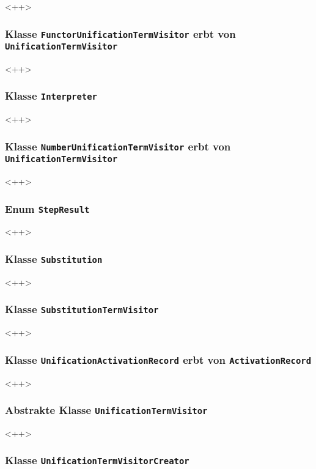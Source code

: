 \documentclass[parskip=full,11pt,twoside]{scrartcl}
\begin{document}
<++>

\subsubsection{Klasse \texttt{FunctorUnificationTermVisitor} erbt von \texttt{UnificationTermVisitor}}

<++>

\subsubsection{Klasse \texttt{Interpreter}}

<++>

\subsubsection{Klasse \texttt{NumberUnificationTermVisitor} erbt von \texttt{UnificationTermVisitor}}

<++>

\subsubsection{Enum \texttt{StepResult}}

<++>

\subsubsection{Klasse \texttt{Substitution}}

<++>

\subsubsection{Klasse \texttt{SubstitutionTermVisitor}}

<++>

\subsubsection{Klasse \texttt{UnificationActivationRecord} erbt von \texttt{ActivationRecord}}

<++>

\subsubsection{Abstrakte Klasse \texttt{UnificationTermVisitor}}

<++>

\subsubsection{Klasse \texttt{UnificationTermVisitorCreator}}
\end{document}
